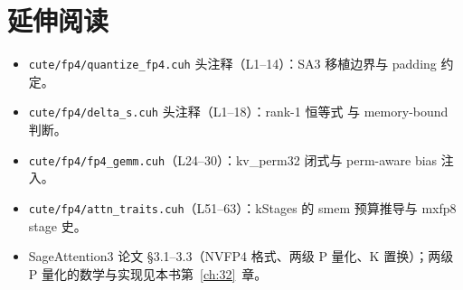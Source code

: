 \section*{延伸阅读}

\begin{itemize}[itemsep=0pt,topsep=2pt]
  \item \texttt{cute/fp4/quantize\_fp4.cuh} 头注释（L1--14）：SA3
        移植边界与 padding 约定。
  \item \texttt{cute/fp4/delta\_s.cuh} 头注释（L1--18）：rank-1 恒等式
        与 memory-bound 判断。
  \item \texttt{cute/fp4/fp4\_gemm.cuh}（L24--30）：kv\_perm32 闭式与
        perm-aware bias 注入。
  \item \texttt{cute/fp4/attn\_traits.cuh}（L51--63）：kStages 的 smem
        预算推导与 mxfp8 stage 史。
  \item SageAttention3 论文 §3.1--3.3（NVFP4 格式、两级 P 量化、K
        置换）；两级 P 量化的数学与实现见本书第~\ref{ch:32}~章。
\end{itemize}
